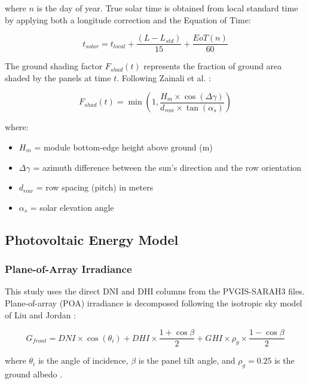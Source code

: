 \documentclass[12pt, a4paper]{article}
\begin{document}
where $n$ is the day of year. True solar time is obtained from local standard time by applying both a longitude correction and the Equation of Time:

\begin{equation}
t_{solar} = t_{local} + \frac{(L - L_{std})}{15} + \frac{EoT(n)}{60}
\label{eq:solartime}
\end{equation}

The ground shading factor $F_{shad}(t)$ represents the fraction of ground area shaded by the panels at time $t$. Following Zainali et al. \cite{zainali2023}:

\begin{equation}
F_{shad}(t) = \min\left(1,\frac{H_m \times \cos(\Delta\gamma)}{d_{row} \times \tan(\alpha_s)}\right)
\label{eq:shading}
\end{equation}

where:
\begin{itemize}[leftmargin=*]
    \item $H_m$ = module bottom-edge height above ground (m)
    \item $\Delta\gamma$ = azimuth difference between the sun's direction and the row orientation
    \item $d_{row}$ = row spacing (pitch) in meters
    \item $\alpha_s$ = solar elevation angle
\end{itemize}

\subsection{Photovoltaic Energy Model}

\subsubsection{Plane-of-Array Irradiance}

This study uses the direct DNI and DHI columns from the PVGIS-SARAH3 files. Plane-of-array (POA) irradiance is decomposed following the isotropic sky model of Liu and Jordan \cite{liu1960}:

\begin{equation}
G_{front} = DNI \times \cos(\theta_i) + DHI \times \frac{1 + \cos\beta}{2} + GHI \times \rho_g \times \frac{1 - \cos\beta}{2}
\label{eq:poa}
\end{equation}

where $\theta_i$ is the angle of incidence, $\beta$ is the panel tilt angle, and $\rho_g = 0.25$ is the ground albedo \cite{monteith2008}.
\end{document}
